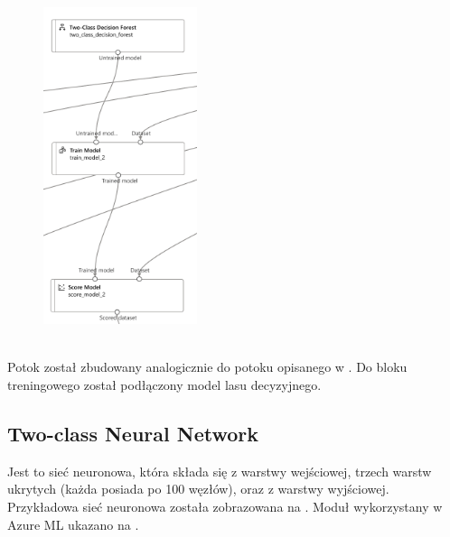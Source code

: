 \begin{figure}[H]
    \centering
    \includegraphics[width=0.4\textwidth]{images/df_pipe}
    \label{fig:df-pipe}
\end{figure}
\ \\
Potok został zbudowany analogicznie do potoku opisanego w . Do bloku treningowego został podłączony model lasu decyzyjnego.

\subsection{Two-class Neural Network}
Jest to sieć neuronowa, która składa się z warstwy wejściowej, trzech warstw ukrytych (każda posiada po 100 węzłów), oraz z warstwy wyjściowej. Przykładowa sieć neuronowa została zobrazowana na . Moduł wykorzystany w Azure ML ukazano na .

